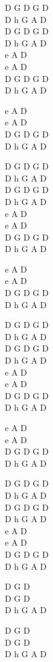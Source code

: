 \begin{chord}
    D G D G D\\
    D h G A D\\
    D G D G D\\
    D h G A D\\
    e A D\\
    e A D\\
    D G D G D\\
    D h G A D

    e A D\\
    e A D\\
    D G D G D\\
    D h G A D

    D G D G D\\
    D h G A D\\
    D G D G D\\
    D h G A D\\
    e A D\\
    e A D\\
    D G D G D\\
    D h G A D

    e A D\\
    e A D\\
    D G D G D\\
    D h G A D

    D G D G D\\
    D h G A D\\
    D G D G D\\
    D h G A D\\
    e A D\\
    e A D\\
    D G D G D\\
    D h G A D

    e A D\\
    e A D\\
    D G D G D\\
    D h G A D

    D G D G D\\
    D h G A D\\
    D G D G D\\
    D h G A D\\
    e A D\\
    e A D\\
    D G D G D\\
    D h G A D

    D G D\\
    D G D\\
    D h G A D

    D G D\\
    D G D\\
    D h G A D
\end{chord}
